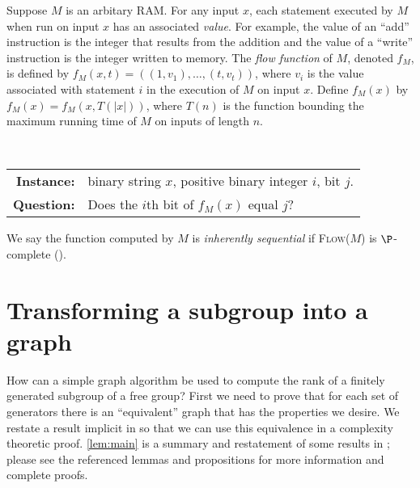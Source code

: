 \documentclass{article}
\begin{document}
Suppose $M$ is an arbitary RAM.
For any input $x$, each statement executed by $M$ when run on input $x$ has an associated \emph{value}.
For example, the value of an ``add'' instruction is the integer that results from the addition and the value of a ``write'' instruction is the integer written to memory.
The \emph{flow function} of $M$, denoted $f_M$, is defined by $f_M(x, t) = ((1, v_1), \dotsc, (t, v_t))$, where $v_i$ is the value associated with statement $i$ in the execution of $M$ on input $x$.
Define $f_M(x)$ by $f_M(x) = f_M(x, T(|x|))$, where $T(n)$ is the function bounding the maximum running time of $M$ on inputs of length $n$.

\begin{definition}
  \mbox{} \\
  \begin{tabular}{r p{9.5cm}}
    \textbf{Instance:} & binary string $x$, positive binary integer $i$, bit $j$. \\
    \textbf{Question:} & Does the $i$th bit of $f_M(x)$ equal $j$?
  \end{tabular}
\end{definition}

We say the function computed by $M$ is \emph{inherently sequential} if \textsc{Flow($M$)} is $\P$-complete (\autocite[Definition~8.2.2]{ghr95}).

\section{Transforming a subgroup into a graph}

How can a simple graph algorithm be used to compute the rank of a finitely generated subgroup of a free group?
First we need to prove that for each set of generators there is an ``equivalent'' graph that has the properties we desire.
We restate a result implicit in \autocite{km02} so that we can use this equivalence in a complexity theoretic proof.
\autoref{lem:main} is a summary and restatement of some results in \autocite{km02}; please see the referenced lemmas and propositions for more information and complete proofs.
\end{document}
